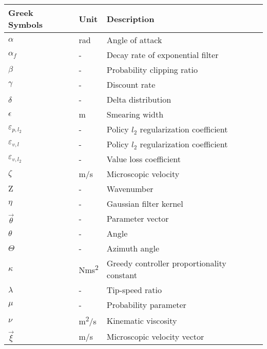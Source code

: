 \vspace{0.5cm}
\begin{longtable}{p{5cm}p{4cm}p{5cm}}
	Greek Symbols    	& Unit       		& Description             \\ \hline
	$\alpha$			& \si{rad}		& Angle of attack \\
	$\alpha_f$			& \si{-}			& Decay rate of exponential filter \\
	$\beta$				& \si{-}			& Probability clipping ratio \\
	$\gamma$			& \si{-}			& Discount rate \\
	$\delta$			& \si{-}			& Delta distribution \\
	$\epsilon$			& \si{m}			& Smearing width \\
	$\varepsilon_{p,l_2}$& \si{-}			& Policy $l_2$ regularization coefficient \\ 
	$\varepsilon_{v,l}$& \si{-}			& Policy $l_2$ regularization coefficient \\ 
	$\varepsilon_{v,l_2}$& \si{-}			& Value loss coefficient \\ 
	$\zeta$				& \si{m/s}		& Microscopic velocity \\
    $\mathrm{Z}$		& \si{-}			& Wavenumber \\
	$\eta$				& \si{-}			& Gaussian filter kernel \\
	$\vec{\theta}$		& \si{-}			& Parameter vector \\
	$\theta$			& \si{-}			& Angle \\
	$\Theta$			& \si{-}			& Azimuth angle \\
	$\kappa$			& \si{Nms\squared}		& Greedy controller proportionality constant \\
	$\lambda$			& \si{-}			& Tip-speed ratio \\
    $\mu$               & \si{-}     		& Probability parameter \\
    $\nu$               & \si{m\squared/s}      & Kinematic viscosity  \\
    $\vec{\xi}$         & \si{m/s}        & Microscopic velocity vector \\

\end{longtable}
